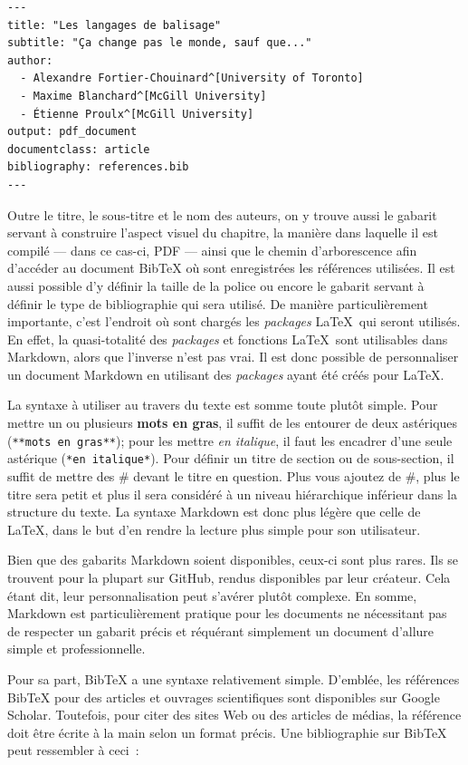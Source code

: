 \documentclass[
  letterpaper,
]{scrbook}
\begin{document}
\begin{verbatim}
---
title: "Les langages de balisage"
subtitle: "Ça change pas le monde, sauf que..."
author:
  - Alexandre Fortier-Chouinard^[University of Toronto]
  - Maxime Blanchard^[McGill University]
  - Étienne Proulx^[McGill University]
output: pdf_document
documentclass: article
bibliography: references.bib
---
\end{verbatim}

Outre le titre, le sous-titre et le nom des auteurs, on y trouve aussi
le gabarit servant à construire l'aspect visuel du chapitre, la manière
dans laquelle il est compilé --- dans ce cas-ci, PDF --- ainsi que le
chemin d'arborescence afin d'accéder au document BibTeX où sont
enregistrées les références utilisées. Il est aussi possible d'y définir
la taille de la police ou encore le gabarit servant à définir le type de
bibliographie qui sera utilisé. De manière particulièrement importante,
c'est l'endroit où sont chargés les \emph{packages} \LaTeX~qui seront
utilisés. En effet, la quasi-totalité des \emph{packages} et fonctions
\LaTeX~sont utilisables dans Markdown, alors que l'inverse n'est pas
vrai. Il est donc possible de personnaliser un document Markdown en
utilisant des \emph{packages} ayant été créés pour \LaTeX.

La syntaxe à utiliser au travers du texte est somme toute plutôt simple.
Pour mettre un ou plusieurs \textbf{mots en gras}, il suffit de les
entourer de deux astériques (\texttt{**mots\ en\ gras**}); pour les
mettre \emph{en italique}, il faut les encadrer d'une seule astérique
(\texttt{*en\ italique*}). Pour définir un titre de section ou de
sous-section, il suffit de mettre des \# devant le titre en question.
Plus vous ajoutez de \#, plus le titre sera petit et plus il sera
considéré à un niveau hiérarchique inférieur dans la structure du texte.
La syntaxe Markdown est donc plus légère que celle de \LaTeX, dans le
but d'en rendre la lecture plus simple pour son utilisateur.

Bien que des gabarits Markdown soient disponibles, ceux-ci sont plus
rares. Ils se trouvent pour la plupart sur GitHub, rendus disponibles
par leur créateur. Cela étant dit, leur personnalisation peut s'avérer
plutôt complexe. En somme, Markdown est particulièrement pratique pour
les documents ne nécessitant pas de respecter un gabarit précis et
réquérant simplement un document d'allure simple et professionnelle.

Pour sa part, BibTeX a une syntaxe relativement simple. D'emblée, les
références BibTeX pour des articles et ouvrages scientifiques sont
disponibles sur Google Scholar. Toutefois, pour citer des sites Web ou
des articles de médias, la référence doit être écrite à la main selon un
format précis. Une bibliographie sur BibTeX peut ressembler à ceci~:
\end{document}
